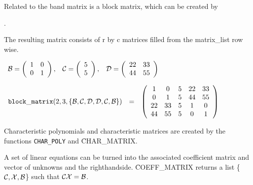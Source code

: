 Related to the band matrix is a block matrix, which can be created by

.

The resulting matrix consists of r by c matrices filled from the
matrix\_list row wise. 

\begin{flushleft}  
\hspace*{0.1in}
\begin{math}  
\begin{array}{ccc}
{\cal B} = \left( \begin{array}{cc} 1 & 0 \\ 0 & 1
\end{array} \right), & 
{\cal C} = \left( \begin{array}{c} 5 \\ 5
\end{array} \right), &
{\cal D} = \left( \begin{array}{cc} 22 & 33 \\ 44 & 55
\end{array} \right) 
\end{array}
\end{math}  
\end{flushleft}

\vspace*{0.175in}

\begin{flushleft}  
\hspace*{0.1in}
\begin{math}  
\begin{array}{ccc}
{\tt block\_matrix}(2,3,\{{\cal B,C,D,D,C,B}\}) & = & 
\left( \begin{array}{ccccc} 1 & 0 & 5 & 22 & 33 \\ 0 & 1 & 5 & 44 & 55 
\\
22 & 33 & 5 & 1 & 0 \\ 44 & 55 & 5 & 0 & 1
\end{array} \right)  
\end{array}  
\end{math}  
\end{flushleft}

Characteristic polynomials and characteristic matrices are created by 
the functions
{\tt CHAR\_POLY} and
\f{CHAR\_MATRIX}. 

A set of linear equations can be turned into the associated
coefficient matrix and vector of unknowns and the righthandside.  
\f{COEFF\_MATRIX} returns a list \{${\cal C,X,B}$\} such that ${\cal
CX} = {\cal B}$. 

